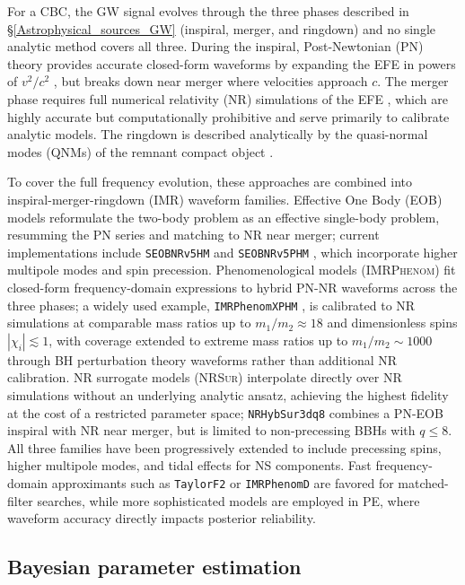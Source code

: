 For a CBC, the GW signal evolves through the three phases described in \S\ref{Astrophysical_sources_GW} (inspiral, merger, and ringdown) and no single analytic method covers all three. During the inspiral, Post-Newtonian (PN) theory provides accurate closed-form waveforms by expanding the EFE in powers of $v^2/c^2$ \cite{Post-Newtonian}, but breaks down near merger where velocities approach $c$. The merger phase requires full numerical relativity (NR) simulations of the EFE \cite{Numerical_relativity}, which are highly accurate but computationally prohibitive and serve primarily to calibrate analytic models. The ringdown is described analytically by the quasi-normal modes (QNMs) of the remnant compact object \cite{quasi_normal_modes}.

To cover the full frequency evolution, these approaches are combined into inspiral-merger-ringdown (\textsc{IMR}) waveform families. Effective One Body (\textsc{EOB}) models reformulate the two-body problem as an effective single-body problem, resumming the PN series and matching to NR near merger; current implementations include \texttt{SEOBNRv5HM} and \texttt{SEOBNRv5PHM} \cite{SEOBNRv5HM, SEOBNRv5PHM}, which incorporate higher multipole modes and spin precession. Phenomenological models (\textsc{IMRPhenom}) fit closed-form frequency-domain expressions to hybrid PN-NR waveforms across the three phases; a widely used example, \texttt{IMRPhenomXPHM} \cite{IMRPhenomXPHM}, is calibrated to NR simulations at comparable mass ratios up to $m_1/m_2\approx18$ and dimensionless spins $|\chi_i|\lesssim 1$, with coverage extended to extreme mass ratios up to $m_1/m_2\sim1000$ through BH perturbation theory waveforms rather than additional NR calibration. NR surrogate models (\textsc{NRSur}) interpolate directly over NR simulations without an underlying analytic ansatz, achieving the highest fidelity at the cost of a restricted parameter space; \texttt{NRHybSur3dq8} \cite{NRHybSur3dq8} combines a PN-EOB inspiral with NR near merger, but is limited to non-precessing BBHs with $q\leq 8$. All three families have been progressively extended to include precessing spins, higher multipole modes, and tidal effects for NS components. Fast frequency-domain approximants such as \texttt{TaylorF2} or \texttt{IMRPhenomD} are favored for matched-filter searches, while more sophisticated models are employed in PE, where waveform accuracy directly impacts posterior reliability.

\subsection{Bayesian parameter estimation}
\label{sec:PE}

